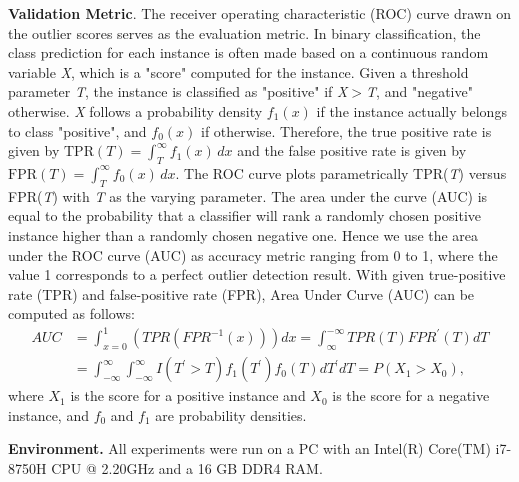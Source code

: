 \documentclass[sigconf,nonacm]{acmart}
\begin{document}
\noindent\textbf{Validation Metric}. The receiver operating characteristic (ROC) curve drawn on the outlier scores serves as the evaluation metric. In binary classification, the class prediction for each instance is often made based on a continuous random variable \textit{X}, which is a "score" computed for the instance. Given a threshold parameter \textit{T}, the instance is classified as "positive" if \textit{X}$>$\textit{T}, and "negative" otherwise. \textit{X} follows a probability density $f_{1}(x)$ if the instance actually belongs to class "positive", and $f_{0}(x)$ if otherwise. Therefore, the true positive rate is given by ${\mbox{TPR}(T)=\int _{T}^{\infty }f_{1}(x)\,dx}$ and the false positive rate is given by ${\mbox{FPR}(T)=\int _{T}^{\infty }f_{0}(x)\,dx}$. The ROC curve plots parametrically TPR(\textit{T}) versus FPR(\textit{T}) with \textit{T} as the varying parameter. The area under the curve (AUC) is equal to the probability that a classifier will rank a randomly chosen positive instance higher than a randomly chosen negative one. Hence we use the area under the ROC curve (AUC) as accuracy metric ranging from 0 to 1, where the value 1 corresponds to a perfect outlier detection result. With given true-positive rate (TPR) and false-positive rate (FPR), Area Under Curve (AUC) can be computed as follows:
\begin{equation}
\begin{split}
    AUC &= \int_{x=0}^{1}(TPR(FPR^{-1}(x)))dx = \int_{\infty}^{-\infty}TPR(T)FPR^{'}(T)dT\\
      &=  \int_{-\infty}^{\infty}\int_{-\infty}^{\infty} I(T^{'}>T)f_{1}(T^{'})f_{0}(T)dT^{'}dT = P(X_{1} > X_{0}),
\end{split}    
\end{equation}where $X_{1}$ is the score for a positive instance and $X_{0}$ is the score for a negative instance, and $f_{0}$ and $f_{1}$ are probability densities.

\noindent\textbf{Environment.} All experiments were run on a PC with an Intel(R) Core(TM) i7-8750H CPU @ 2.20GHz and a 16 GB DDR4 RAM.
\end{document}
